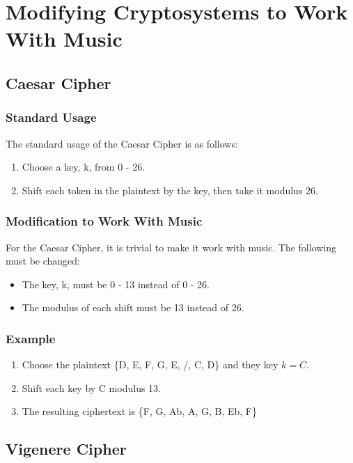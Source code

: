 \documentclass[14pt]{article}
\begin{document}
	\section{Modifying Cryptosystems to Work With Music}
        \subsection{Caesar Cipher}
            \subsubsection{Standard Usage}
            The standard usage of the Caesar Cipher is as follows:
            \begin{enumerate}
                \item Choose a key, k, from 0 - 26.
                \item Shift each token in the plaintext by the key, then take it modulus 26.
            \end{enumerate}
            \cite{Trappe}
            
            \subsubsection{Modification to Work With Music}
            For the Caesar Cipher, it is trivial to make it work with music. The following must be changed:
            \begin{itemize}
                \item The key, k, must be 0 - 13 instead of 0 - 26.
                \item The modulus of each shift must be 13 instead of 26.
            \end{itemize}

            \subsubsection{Example}
            \begin{enumerate}
                \item Choose the plaintext \{D, E, F, G, E, /, C, D\} and they key $k = C$.
                \item Shift each key by C modulus 13.
                \item The resulting ciphertext is \{F, G, Ab, A, G, B, Eb, F\}
            \end{enumerate}
    
        \subsection{Vigenere Cipher}
\end{document}
